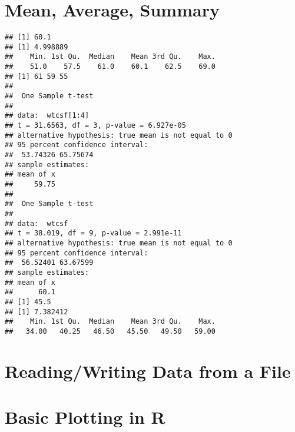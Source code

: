 \documentclass[a4paper,10pt]{book}\usepackage[]{graphicx}\usepackage[]{color}
\makeatletter
\newenvironment{kframe}{%
 \def\at@end@of@kframe{}%
 \ifinner\ifhmode%
  \def\at@end@of@kframe{\end{minipage}}%
  \begin{minipage}{\columnwidth}%
 \fi\fi%
 \def\FrameCommand##1{\hskip\@totalleftmargin \hskip-\fboxsep
 \colorbox{shadecolor}{##1}\hskip-\fboxsep
     \hskip-\linewidth \hskip-\@totalleftmargin \hskip\columnwidth}%
 \MakeFramed {\advance\hsize-\width
   \@totalleftmargin\z@ \linewidth\hsize
   \@setminipage}}%
 {\par\unskip\endMakeFramed%
 \at@end@of@kframe}
\newenvironment{knitrout}{}{} %
\makeatother
\begin{document}
\section*{Mean, Average, Summary}

\begin{knitrout}
\color{fgcolor}\begin{kframe}
\begin{verbatim}
## [1] 60.1
## [1] 4.998889
##    Min. 1st Qu.  Median    Mean 3rd Qu.    Max. 
##    51.0    57.5    61.0    60.1    62.5    69.0
## [1] 61 59 55
## 
## 	One Sample t-test
## 
## data:  wtcsf[1:4]
## t = 31.6563, df = 3, p-value = 6.927e-05
## alternative hypothesis: true mean is not equal to 0
## 95 percent confidence interval:
##  53.74326 65.75674
## sample estimates:
## mean of x 
##     59.75
## 
## 	One Sample t-test
## 
## data:  wtcsf
## t = 38.019, df = 9, p-value = 2.991e-11
## alternative hypothesis: true mean is not equal to 0
## 95 percent confidence interval:
##  56.52401 63.67599
## sample estimates:
## mean of x 
##      60.1
## [1] 45.5
## [1] 7.382412
##    Min. 1st Qu.  Median    Mean 3rd Qu.    Max. 
##   34.00   40.25   46.50   45.50   49.50   59.00
\end{verbatim}
\end{kframe}
\end{knitrout}

\section*{Reading/Writing Data from a File}



\section*{Basic Plotting in R}
\end{document}
